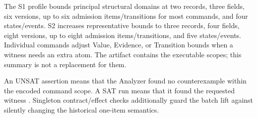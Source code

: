 The S1 profile bounds principal structural domains at two records, three fields, six versions, up to six admission items/transitions for most commands, and four states/events. S2 increases representative bounds to three records, four fields, eight versions, up to eight admission items/transitions, and five states/events. Individual commands adjust Value, Evidence, or Transition bounds when a witness needs an extra atom. The artifact contains the executable scopes; this summary is not a replacement for them.



An UNSAT assertion means that the Analyzer found no counterexample within the encoded command scope. A SAT run means that it found the requested witness \citep{jackson2002alloy,torlak2007kodkod}. Singleton contract/effect checks additionally guard the batch lift against silently changing the historical one-item semantics.
